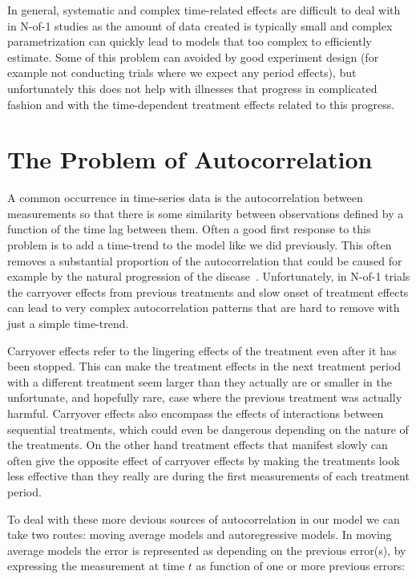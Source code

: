 \documentclass[12pt,a4paper,leqno]{report}
\theoremstyle{plain}
\theoremstyle{definition}
\theoremstyle{remark}
\begin{document}
In general, systematic and complex time-related effects are difficult to
deal with in N-of-1 studies as the amount of data created is typically small
and complex parametrization can quickly lead to models that too complex to efficiently
estimate. Some of this problem can avoided by good experiment design (for example not
conducting trials where we expect any period effects), but unfortunately this does not
help with illnesses that progress in complicated fashion and with the time-dependent
treatment effects related to this progress.

\section{The Problem of Autocorrelation}\label{autocor}

A common occurrence in time-series data is the autocorrelation between
measurements so that there is some similarity between observations defined by a
function of the time lag between them. Often a good first response to this problem
is to add a time-trend to the model like we did previously. This
often removes a substantial proportion of the autocorrelation that could be
caused for example by the natural progression of the disease\ \cite{stat}.
Unfortunately, in N-of-1 trials the carryover effects
from previous treatments and slow onset of treatment effects can lead to very
complex autocorrelation patterns that are hard to remove with just a simple time-trend.

Carryover effects refer to the lingering effects of the treatment even after it
has been stopped. This can make the treatment effects in the next treatment period
with a different treatment seem larger than they actually are or smaller in the
unfortunate, and hopefully rare, case where the previous treatment was actually
harmful. Carryover effects also encompass the effects of interactions between
sequential treatments, which could even be dangerous depending on the nature of
the treatments. On the other hand treatment effects that manifest slowly can
often give the opposite effect of carryover effects by making the treatments
look less effective than they really are during the first measurements of each
treatment period.\cite{stat}

To deal with these more devious sources of autocorrelation in our model we can
take two routes: moving average models and autoregressive models. In moving
average models the error is represented as depending on the previous error(s), by
expressing the measurement at time \(t\) as function of one or more previous
errors:
\end{document}
